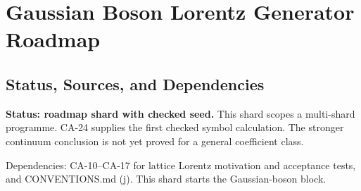 
\section{Gaussian Boson Lorentz Generator Roadmap}
\label{sec:gaussian-boson-lorentz-roadmap}

\subsection{Status, Sources, and Dependencies}

\textbf{Status: roadmap shard with checked seed.}  This shard scopes a
multi-shard programme.  CA-24 supplies the first checked symbol calculation.
The stronger continuum conclusion is not yet proved for a general coefficient
class.

Dependencies: CA-10--CA-17 for lattice Lorentz motivation and acceptance tests,
and CONVENTIONS.md (j).  This shard starts the Gaussian-boson block.


